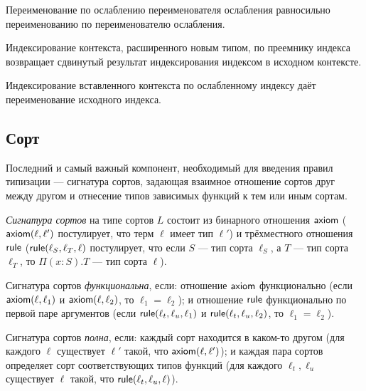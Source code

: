 \begin{lemma}
Переименование по ослаблению переименователя ослабления
равносильно переименованию по переименователю
ослабления.
\end{lemma}

\begin{lemma}
Индексирование контекста, расширенного новым типом,
по преемнику индекса возвращает сдвинутый результат
индексирования индексом в исходном контексте.
\end{lemma}

\begin{lemma}
Индексирование вставленного контекста по ослабленному
индексу даёт переименование исходного индекса.
\end{lemma}

\subsection{Сорт}

Последний и самый важный компонент, необходимый для
введения правил типизации --- сигнатура сортов,
задающая взаимное отношение сортов друг между другом и
отнесение типов зависимых функций к тем или иным
сортам.

\begin{class}
\emph{Сигнатура сортов} на типе сортов $L$ состоит из
бинарного отношения $\mathsf{axiom}$ ($\mathsf{axiom}(\ell,\ell')$
постулирует, что терм $\ell$ имеет тип $\ell'$) и
трёхместного отношения $\mathsf{rule}$
($\mathsf{rule}(\ell_S,\ell_T,\ell)$ постулирует, что если $S$
--- тип сорта $\ell_S$, а $T$ --- тип сорта $\ell_T$,
то $\Pi(x:S).T$ --- тип сорта $\ell$).
\end{class}

\begin{class}
Сигнатура сортов \emph{функциональна}, если:
отношение $\mathsf{axiom}$ функционально (если
$\mathsf{axiom}(\ell, \ell_1)$ и $\mathsf{axiom}(\ell, \ell_2)$, то
$\ell_1 = \ell_2$); и отношение $\mathsf{rule}$
функционально по первой паре аргументов (если
$\mathsf{rule}(\ell_t, \ell_u, \ell_1)$ и
$\mathsf{rule}(\ell_t, \ell_u, \ell_2)$, то
$\ell_1 = \ell_2$).
\end{class}

\begin{class}
Сигнатура сортов \emph{полна}, если:
каждый сорт находится в каком-то другом (для каждого
$\ell$ существует $\ell'$ такой, что
$\mathsf{axiom}(\ell, \ell')$); и каждая пара сортов определяет
сорт соответствующих типов функций (для каждого
$\ell_t, \ell_u$ существует $\ell$ такой,
что $\mathsf{rule}(\ell_t, \ell_u, \ell)$).
\end{class}

